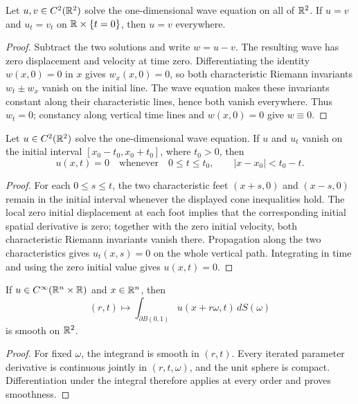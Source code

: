 \begin{lemma}
\label{lem:wave-cauchy-uniqueness-1d}


Let $u,v \in C^2(\mathbb{R}^2)$ solve the one-dimensional wave equation on all of
$\mathbb{R}^2$. If $u=v$ and $u_t=v_t$ on $\mathbb{R}\times\{t=0\}$, then $u=v$ everywhere.
\end{lemma}
\begin{proof}

Subtract the two solutions and write $w=u-v$. The resulting wave has zero
displacement and velocity at time zero. Differentiating the identity
$w(x,0)=0$ in $x$ gives $w_x(x,0)=0$, so both characteristic Riemann
invariants $w_t\pm w_x$ vanish on the initial line. The wave equation makes
these invariants constant along their characteristic lines, hence both vanish
everywhere. Thus $w_t=0$; constancy along vertical time lines and $w(x,0)=0$
give $w\equiv0$.
\end{proof}

\begin{lemma}
\label{lem:wave-finite-propagation-1d}


Let $u \in C^2(\mathbb{R}^2)$ solve the one-dimensional wave equation. If $u$ and
$u_t$ vanish on the initial interval $[x_0-t_0,x_0+t_0]$, where $t_0>0$, then
\[
u(x,t)=0 \quad\text{whenever}\quad 0\leq t\leq t_0,
\qquad |x-x_0|<t_0-t.
\]
\end{lemma}
\begin{proof}

For each $0\leq s\leq t$, the two characteristic feet $(x+s,0)$ and
$(x-s,0)$ remain in the initial interval whenever the displayed cone
inequalities hold. The local zero initial displacement at each foot implies
that the corresponding initial spatial derivative is zero; together with the
zero initial velocity, both characteristic Riemann invariants vanish there.
Propagation along the two characteristics gives $u_t(x,s)=0$ on the whole
vertical path. Integrating in time and using the zero initial value gives
$u(x,t)=0$.
\end{proof}

\begin{lemma}
\label{lem:wave-spherical-mean-smoothness}


If $u\in C^\infty(\mathbb{R}^n\times\mathbb{R})$ and $x\in\mathbb{R}^n$, then
\[
(r,t)\longmapsto
\int_{\partial B(0,1)}u(x+r\omega,t)\,dS(\omega)
\]
is smooth on $\mathbb{R}^2$.
\end{lemma}
\begin{proof}

For fixed $\omega$, the integrand is smooth in $(r,t)$. Every iterated
parameter derivative is continuous jointly in $(r,t,\omega)$, and the unit
sphere is compact. Differentiation under the integral therefore applies at
every order and proves smoothness.
\end{proof}


